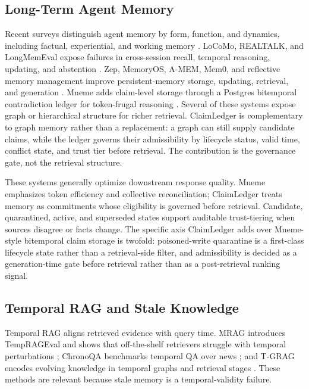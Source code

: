 \subsection{Long-Term Agent Memory}\label{sec:related-agent-memory}

Recent surveys distinguish agent memory by form, function, and dynamics, including factual, experiential, and working memory \cite{hu2025memorysurvey}. LoCoMo, REALTALK, and LongMemEval expose failures in cross-session recall, temporal reasoning, updating, and abstention \cite{maharana2024locomo,realtalk2025,wu2024longmemeval}. Zep, MemoryOS, A-MEM, Mem0, and reflective memory management improve persistent-memory storage, updating, retrieval, and generation \cite{rasmussen2025zep,kang2025memoryos,xu2025amem,mem02025,rmm2025}. Mneme adds claim-level storage through a Postgres bitemporal contradiction ledger for token-frugal reasoning \cite{mneme2026}. Several of these systems expose graph or hierarchical structure for richer retrieval. ClaimLedger is complementary to graph memory rather than a replacement: a graph can still supply candidate claims, while the ledger governs their admissibility by lifecycle status, valid time, conflict state, and trust tier before retrieval. The contribution is the governance gate, not the retrieval structure.

These systems generally optimize downstream response quality. Mneme emphasizes token efficiency and collective reconciliation; ClaimLedger treats memory as commitments whose eligibility is governed before retrieval. Candidate, quarantined, active, and superseded states support auditable trust-tiering when sources disagree or facts change. The specific axis ClaimLedger adds over Mneme-style bitemporal claim storage is twofold: poisoned-write quarantine is a first-class lifecycle state rather than a retrieval-side filter, and admissibility is decided as a generation-time gate before retrieval rather than as a post-retrieval ranking signal.

\subsection{Temporal RAG and Stale Knowledge}\label{sec:related-temporal-rag}

Temporal RAG aligns retrieved evidence with query time. MRAG introduces TempRAGEval and shows that off-the-shelf retrievers struggle with temporal perturbations \cite{zhang2024mrag}; ChronoQA benchmarks temporal QA over news \cite{chen2025chronoqa}; and T-GRAG encodes evolving knowledge in temporal graphs and retrieval stages \cite{li2025tgrag}. These methods are relevant because stale memory is a temporal-validity failure.

